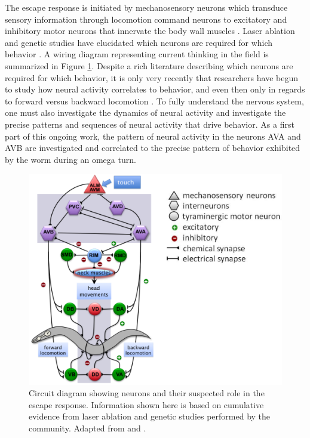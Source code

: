  The escape response is initiated by mechanosensory neurons which transduce sensory information through locomotion command neurons to excitatory and inhibitory motor neurons that innervate the body wall muscles \citep{chalfie_neural_1985}. Laser ablation and genetic studies have  elucidated which neurons are required for which behavior \citep{chalfie_neural_1985, zheng_neuronal_1999, alkema_tyramine_2005}. A wiring diagram representing current thinking in the field is summarized in Figure \ref{fig:omegaCircuitDiagram}. Despite a rich literature describing which neurons are required for which behavior, it is only very recently that researchers have begun to study how neural activity correlates to behavior, and even then only in regards to forward versus backward locomotion \citep{piggott_neural_2011, faumont_image-free_2011, kawano_imbalancing_2011, ben_arous_automated_2010}. To fully understand the nervous system, one must also investigate the dynamics of neural activity and investigate the precise patterns and sequences of neural activity that drive behavior. As a first part of this ongoing work, the pattern of neural activity in the neurons AVA and AVB are investigated and correlated to the precise pattern of behavior exhibited by the worm during an omega turn. 

\begin{figure}  %
\includegraphics[width=\textwidth]{figures/omegaCircuitDiagram}
\caption[Circuit diagram representing current thinking in the field]{Circuit diagram showing neurons and their suspected role in the escape response. Information shown here is based on cumulative evidence from laser ablation and genetic studies performed by the community. Adapted from \citep{alkema_tyramine_2005} and \citep{pirri_tyramine-gated_2009}. 
\label{fig:omegaCircuitDiagram}}
\end{figure}

